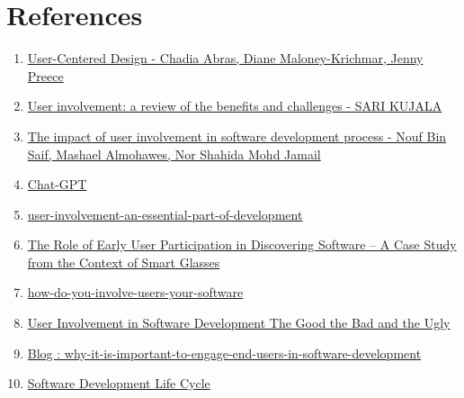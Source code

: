 \documentclass{article}
\begin{document}
\section{References}
    \begin{enumerate}
      \item \href{https://www.academia.edu/1012299/User_centered_design} {User-Centered Design - Chadia Abras, Diane Maloney-Krichmar, Jenny Preece}
      \item \href{https://www.researchgate.net/publication/220208710_User_involvement_A_review_of_the_benefits_and_challenges} {User involvement: a review of the benefits and challenges - SARI KUJALA}
      \item \href{https://www.researchgate.net/publication/348292073_The_impact_of_user_involvement_in_software_development_process} {The impact of user involvement in software development process - Nouf Bin Saif, Mashael Almohawes, Nor Shahida Mohd Jamail }
      \item \href{https://chat.openai.com/ } {Chat-GPT}
      \item \href{https://medium.com/softserve-do/user-involvement-an-essential-part-of-development-638a76029c62#:~:text=Most%20software%20and%20hardware%20companies,user%20feedback%20into%20initial%20concepts.} {user-involvement-an-essential-part-of-development}
      \item \href{https://aisel.aisnet.org/cgi/viewcontent.cgi?article=1256&context=wi2019}{The Role of Early User Participation in Discovering
Software – A Case Study from the Context of Smart Glasses}
    \item \href{https://www.linkedin.com/advice/0/how-do-you-involve-users-your-software}{how-do-you-involve-users-your-software}
    \item \href{https://www.researchgate.net/publication/329301740_User_Involvement_in_Software_Development_The_Good_the_Bad_and_the_Ugly}{User Involvement in Software Development The Good the Bad and the Ugly}
    \item \href{https://headchannel.co.uk/blog/why-it-is-important-to-engage-end-users-in-software-development/}{Blog : why-it-is-important-to-engage-end-users-in-software-development}
    \item \href{https://theproductmanager.com/topics/software-development-life-cycle/} {Software Development Life Cycle}
    \end{enumerate}
\end{document}
